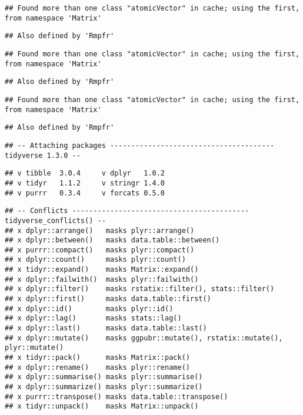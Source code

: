 \documentclass[
]{article}
\begin{document}
\begin{verbatim}
## Found more than one class "atomicVector" in cache; using the first, from namespace 'Matrix'
\end{verbatim}

\begin{verbatim}
## Also defined by 'Rmpfr'
\end{verbatim}

\begin{verbatim}
## Found more than one class "atomicVector" in cache; using the first, from namespace 'Matrix'
\end{verbatim}

\begin{verbatim}
## Also defined by 'Rmpfr'
\end{verbatim}

\begin{verbatim}
## Found more than one class "atomicVector" in cache; using the first, from namespace 'Matrix'
\end{verbatim}

\begin{verbatim}
## Also defined by 'Rmpfr'
\end{verbatim}

\begin{verbatim}
## -- Attaching packages --------------------------------------- tidyverse 1.3.0 --
\end{verbatim}

\begin{verbatim}
## v tibble  3.0.4     v dplyr   1.0.2
## v tidyr   1.1.2     v stringr 1.4.0
## v purrr   0.3.4     v forcats 0.5.0
\end{verbatim}

\begin{verbatim}
## -- Conflicts ------------------------------------------ tidyverse_conflicts() --
## x dplyr::arrange()   masks plyr::arrange()
## x dplyr::between()   masks data.table::between()
## x purrr::compact()   masks plyr::compact()
## x dplyr::count()     masks plyr::count()
## x tidyr::expand()    masks Matrix::expand()
## x dplyr::failwith()  masks plyr::failwith()
## x dplyr::filter()    masks rstatix::filter(), stats::filter()
## x dplyr::first()     masks data.table::first()
## x dplyr::id()        masks plyr::id()
## x dplyr::lag()       masks stats::lag()
## x dplyr::last()      masks data.table::last()
## x dplyr::mutate()    masks ggpubr::mutate(), rstatix::mutate(), plyr::mutate()
## x tidyr::pack()      masks Matrix::pack()
## x dplyr::rename()    masks plyr::rename()
## x dplyr::summarise() masks plyr::summarise()
## x dplyr::summarize() masks plyr::summarize()
## x purrr::transpose() masks data.table::transpose()
## x tidyr::unpack()    masks Matrix::unpack()
\end{verbatim}
\end{document}
